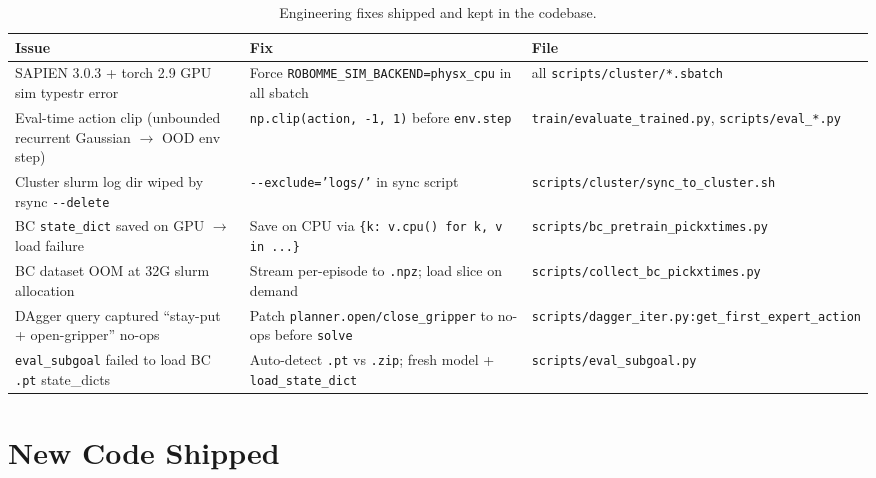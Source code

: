 \documentclass[11pt,letterpaper]{article}
\begin{document}
\begin{table}[H]
\centering
\begin{tabular}{p{4.5cm}p{5cm}p{4cm}}
\toprule
\textbf{Issue} & \textbf{Fix} & \textbf{File} \\
\midrule
SAPIEN 3.0.3 + torch 2.9 GPU sim typestr error
& Force \texttt{ROBOMME\_SIM\_BACKEND=physx\_cpu} in all sbatch
& all \texttt{scripts/cluster/*.sbatch} \\
\addlinespace
Eval-time action clip (unbounded recurrent Gaussian $\to$ OOD env step)
& \texttt{np.clip(action, -1, 1)} before \texttt{env.step}
& \texttt{train/evaluate\_trained.py}, \texttt{scripts/eval\_*.py} \\
\addlinespace
Cluster slurm log dir wiped by rsync \texttt{-{}-delete}
& \texttt{-{}-exclude='logs/'} in sync script
& \texttt{scripts/cluster/sync\_to\_cluster.sh} \\
\addlinespace
BC \texttt{state\_dict} saved on GPU $\to$ load failure
& Save on CPU via \texttt{\{k: v.cpu() for k, v in ...\}}
& \texttt{scripts/bc\_pretrain\_pickxtimes.py} \\
\addlinespace
BC dataset OOM at 32G slurm allocation
& Stream per-episode to \texttt{.npz}; load slice on demand
& \texttt{scripts/collect\_bc\_pickxtimes.py} \\
\addlinespace
DAgger query captured ``stay-put + open-gripper'' no-ops
& Patch \texttt{planner.open/close\_gripper} to no-ops before \texttt{solve}
& \texttt{scripts/dagger\_iter.py:\allowbreak get\_first\_expert\_action} \\
\addlinespace
\texttt{eval\_subgoal} failed to load BC \texttt{.pt} state\_dicts
& Auto-detect \texttt{.pt} vs \texttt{.zip}; fresh model + \texttt{load\_state\_dict}
& \texttt{scripts/eval\_subgoal.py} \\
\bottomrule
\end{tabular}
\caption{Engineering fixes shipped and kept in the codebase.}
\end{table}

\section{New Code Shipped}
\label{sec:code}
\end{document}
